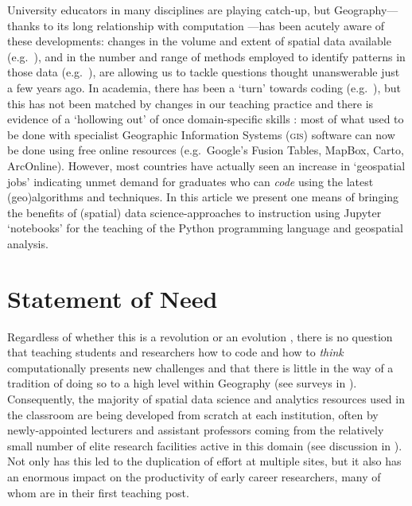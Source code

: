 \documentclass[letter, 11pt,titlepage]{article}
\newcommand{\eg}{e.g.~\/}
\begin{document}
University educators in many disciplines are playing catch-up, but Geography---thanks to its long relationship with computation \citep{ArribasBel2018}---has been acutely aware of these developments: changes in the volume and extent of spatial data available (\eg \citealp{Graham2013,gonzalez2013big,reades2016}), and in the number and range of methods employed to identify patterns in those data (\eg \citealp{Fan2016,Naik2017,Santibanez2015,Stevens2015,ArribasBel2017}), are allowing us to tackle questions thought unanswerable just a few years ago. In academia, there has been a `turn' towards coding (\eg \citealp{Brunsdon:2020aa}), but this has not been matched by changes in our teaching practice and there is evidence of a `hollowing out' of once domain-specific skills \citep{Singleton2014,Singleton2016}: most of what used to be done with specialist Geographic Information Systems (\textsc{gis}) software can now be done using free online resources (\eg Google's Fusion Tables, MapBox, Carto, ArcOnline). However, most countries have actually seen an increase in `geospatial jobs' \citep{Solis:2020aa} indicating unmet demand for graduates who can \emph{code} using the latest (geo)algorithms and techniques. In this article we present one means of bringing the benefits of (spatial) data science-approaches to instruction using Jupyter `notebooks' for the teaching of the Python programming language and geospatial analysis.

\section{Statement of Need}

Regardless of whether this is a revolution \citep{Wyly2014,Torrens2010} or an
evolution \citep{Barnes2013,Barnes2014}, there is no question that teaching
students and researchers how to code and how to \emph{think} computationally \citep{Barba_2015_bids} presents new challenges \citep{Etherington2016,Muller2014,rey_09jgs} and that there is little in the way of a tradition of doing so to a high level within Geography (see surveys in \citealp{Bowlick2017,Bowlick2018}). Consequently, the majority of spatial data science and analytics resources used in the classroom are being developed from scratch at each institution, often by newly-appointed lecturers and assistant professors coming from the relatively small number of elite research facilities active in this domain (see discussion in \citealp{esrc2013}). Not only has this led to the duplication of effort at multiple sites, but it also has an enormous impact on the productivity of early career researchers, many of whom are in their first teaching post.
\end{document}

